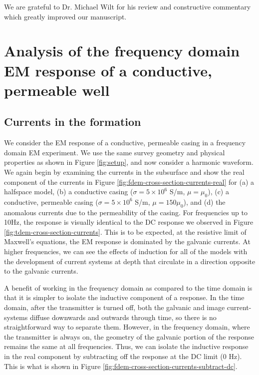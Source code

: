 \documentclass[onecolumn, extra, mreferee]{gji}
\begin{document}
We are grateful to Dr. Michael Wilt for his review and constructive commentary which greatly improved our manuscript.


\clearpage




\clearpage

\appendix

\section{Analysis of the frequency domain EM response of a conductive, permeable well}
\label{app:fdem}

\subsection{Currents in the formation}
We consider the EM response of a conductive, permeable casing in a frequency domain EM experiment. We use the same survey geometry and physical properties as shown in Figure \ref{fig:setup}, and now consider a harmonic waveform. We again begin by examining the currents in the subsurface and show the real component of the currents in Figure \ref{fig:fdem-cross-section-currents-real} for (a) a halfspace model, (b) a conductive casing ($\sigma = 5\times10^6$ S/m, $\mu=\mu_0$), (c) a conductive, permeable casing ($\sigma = 5\times10^6$ S/m, $\mu=150\mu_0$), and (d) the anomalous currents due to the permeability of the casing. For frequencies up to 10Hz, the response is visually identical to the DC response we observed in Figure \ref{fig:tdem-cross-section-currents}. This is to be expected, at the resistive limit of Maxwell's equations, the EM response is dominated by the galvanic currents. At higher frequencies, we can see the effects of induction for all of the models with the development of current systems at depth that circulate in a direction opposite to the galvanic currents.




A benefit of working in the frequency domain as compared to the time domain is that it is simpler to isolate the inductive component of a response. In the time domain, after the transmitter is turned off, both the galvanic and image current-systems diffuse downwards and outwards through time, so there is no straightforward way to separate them. However, in the frequency domain, where the transmitter is always on, the geometry of the galvanic portion of the response remains the same at all frequencies. Thus, we can isolate the inductive response in the real component by subtracting off the response at the DC limit (0 Hz). This is what is shown in Figure \ref{fig:fdem-cross-section-currents-subtract-dc}.
\end{document}
